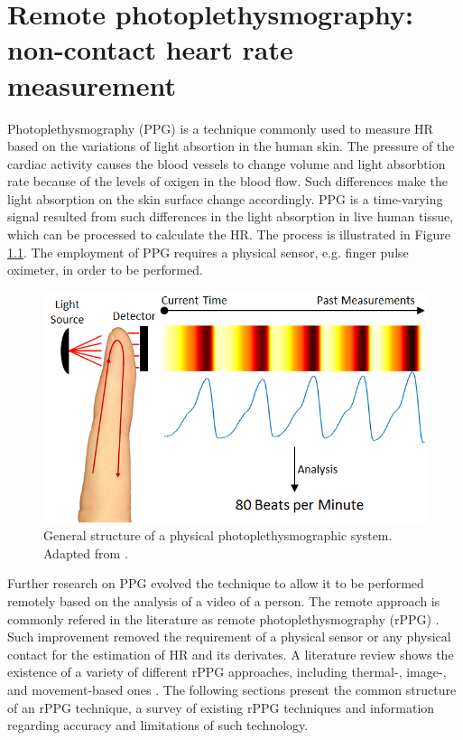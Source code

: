 \chapter{Remote photoplethysmography: non-contact heart rate measurement}
\label{ch:literature-rppg}

Photoplethysmography (PPG) is a technique commonly used to measure HR based on the variations of light absortion in the human skin. The pressure of the cardiac activity causes the blood vessels to change volume and light absorbtion rate because of the levels of oxigen in the blood flow. Such differences make the light absorption on the skin surface change accordingly. PPG is a time-varying signal resulted from such differences in the light absorption in live human tissue, which can be processed to calculate the HR. The process is illustrated in Figure \ref{fig:ppg}. The employment of PPG requires a physical sensor, e.g. finger pulse oximeter, in order to be performed.

\begin{figure}[h]
\centering
\includegraphics[width=0.7\linewidth]{figures/ppg.png}
\caption{General structure of a physical photoplethysmographic system. Adapted from \textcite{chwyl2016statistical}.}
\label{fig:ppg}
\end{figure}

Further research on PPG \parencite{mcduff2015survey} evolved the technique to allow it to be performed remotely based on the analysis of a video of a person. The remote approach is commonly refered in the literature as remote photoplethysmography (rPPG)  \parencite{allen2007photoplethysmography}. Such improvement removed the requirement of a physical sensor or any physical contact for the estimation of HR and its derivates. A literature review shows the existence of a variety of different rPPG approaches, including thermal-, image-, and movement-based ones \parencite{kranjec2014non, Sereevoravitgul}. The following sections present the common structure of an rPPG technique, a survey of existing rPPG techniques and information regarding accuracy and limitations of such technology.

